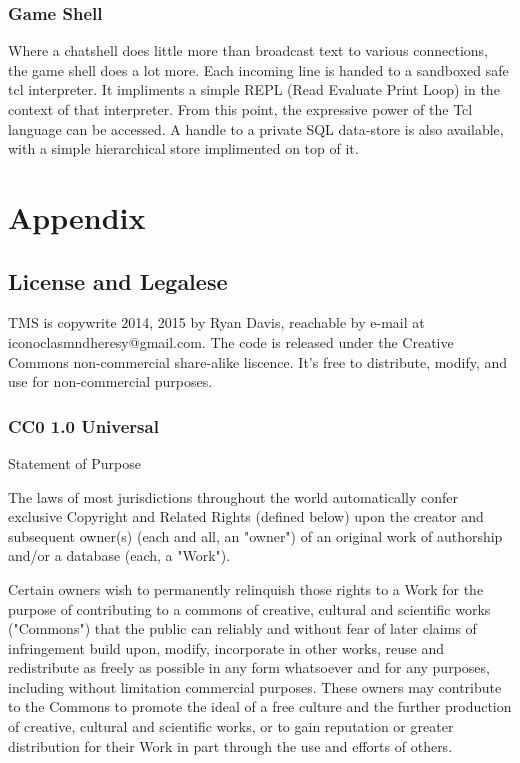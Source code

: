 \documentclass[10pt,letterpaper,twoside]{book}
\begin{document}
\section{Game Shell}
Where a chatshell does little more than broadcast text to various connections, the game shell does a lot more.
Each incoming line is handed to a sandboxed safe tcl interpreter.
It impliments a simple REPL (Read Evaluate Print Loop) in the context of that interpreter.
From this point, the expressive power of the Tcl language can be accessed.
A handle to a private SQL data-store is also available, with a simple hierarchical store implimented on top of it.
\backmatter
\part{Appendix}
\chapter{License and Legalese}
TMS is copywrite 2014, 2015 by Ryan Davis, reachable by e-mail at iconoclasmndheresy@gmail.com.
The code is released under the Creative Commons non-commercial share-alike liscence. It's free to distribute, modify, and use for non-commercial purposes.


\section{CC0 1.0 Universal}

Statement of Purpose

The laws of most jurisdictions throughout the world automatically confer
exclusive Copyright and Related Rights (defined below) upon the creator and
subsequent owner(s) (each and all, an "owner") of an original work of
authorship and/or a database (each, a "Work").

Certain owners wish to permanently relinquish those rights to a Work for the
purpose of contributing to a commons of creative, cultural and scientific
works ("Commons") that the public can reliably and without fear of later
claims of infringement build upon, modify, incorporate in other works, reuse
and redistribute as freely as possible in any form whatsoever and for any
purposes, including without limitation commercial purposes. These owners may
contribute to the Commons to promote the ideal of a free culture and the
further production of creative, cultural and scientific works, or to gain
reputation or greater distribution for their Work in part through the use and
efforts of others.
\end{document}
